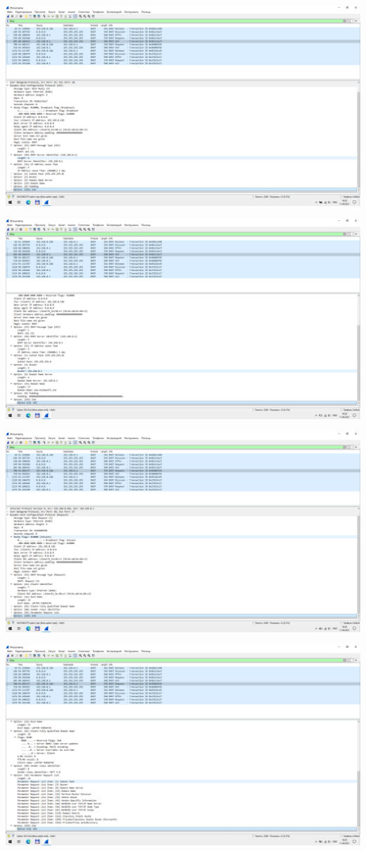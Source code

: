\begin{center}
    \includegraphics[width=\textwidth]{screenshots/dhcp_ack1_1}

    \includegraphics[width=\textwidth]{screenshots/dhcp_ack1_2}

    \includegraphics[width=\textwidth]{screenshots/dhcp_request2_1}

    \includegraphics[width=\textwidth]{screenshots/dhcp_request2_2}


\end{center}
